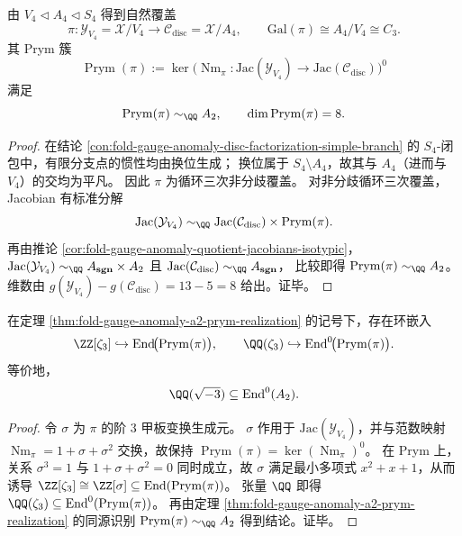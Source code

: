 \begin{theorem}\label{thm:fold-gauge-anomaly-a2-prym-realization}
由 \(V_4\triangleleft A_4\triangleleft S_4\) 得到自然覆盖
\[
\pi:\mathcal Y_{V_4}=\mathcal X/V_4\longrightarrow \mathcal C_{\mathrm{disc}}=\mathcal X/A_4,
\qquad
\mathrm{Gal}(\pi)\cong A_4/V_4\cong C_3.
\]
其 Prym 簇
\[
\operatorname{Prym}(\pi):=\ker\!\bigl(\operatorname{Nm}_{\pi}:\mathrm{Jac}(\mathcal Y_{V_4})\to \mathrm{Jac}(\mathcal C_{\mathrm{disc}})\bigr)^0
\]
满足
\[
\operatorname{Prym}(\pi)\sim_{\QQ}A_2,
\qquad
\dim \operatorname{Prym}(\pi)=8.
\]
\end{theorem}
\begin{proof}
在结论 \ref{con:fold-gauge-anomaly-disc-factorization-simple-branch} 的 \(S_4\)-闭包中，有限分支点的惯性均由换位生成；
换位属于 \(S_4\setminus A_4\)，故其与 \(A_4\)（进而与 \(V_4\)）的交均为平凡。
因此 \(\pi\) 为循环三次非分歧覆盖。
对非分歧循环三次覆盖，Jacobian 有标准分解
\[
\mathrm{Jac}(\mathcal Y_{V_4})\sim_{\QQ}\mathrm{Jac}(\mathcal C_{\mathrm{disc}})\times \operatorname{Prym}(\pi).
\]
再由推论 \ref{cor:fold-gauge-anomaly-quotient-jacobians-isotypic}，
\(
\mathrm{Jac}(\mathcal Y_{V_4})\sim_{\QQ}A_{\mathbf{sgn}}\times A_2
\)
且
\(
\mathrm{Jac}(\mathcal C_{\mathrm{disc}})\sim_{\QQ}A_{\mathbf{sgn}}
\)，
比较即得 \(\operatorname{Prym}(\pi)\sim_{\QQ}A_2\)。
维数由
\(
g(\mathcal Y_{V_4})-g(\mathcal C_{\mathrm{disc}})=13-5=8
\)
给出。证毕。
\end{proof}


\begin{theorem}\label{thm:fold-gauge-anomaly-a2-eisenstein-multiplication}
在定理 \ref{thm:fold-gauge-anomaly-a2-prym-realization} 的记号下，存在环嵌入
\[
\ZZ[\zeta_3]\hookrightarrow \operatorname{End}\!\bigl(\operatorname{Prym}(\pi)\bigr),
\qquad
\QQ(\zeta_3)\hookrightarrow \operatorname{End}^0\!\bigl(\operatorname{Prym}(\pi)\bigr).
\]
等价地，
\[
\QQ(\sqrt{-3})\subseteq \operatorname{End}^0(A_2).
\]
\end{theorem}
\begin{proof}
令 \(\sigma\) 为 \(\pi\) 的阶 \(3\) 甲板变换生成元。
\(\sigma\) 作用于 \(\mathrm{Jac}(\mathcal Y_{V_4})\)，并与范数映射 \(\operatorname{Nm}_{\pi}=1+\sigma+\sigma^2\) 交换，故保持
\(\operatorname{Prym}(\pi)=\ker(\operatorname{Nm}_{\pi})^0\)。
在 Prym 上，关系 \(\sigma^3=1\) 与 \(1+\sigma+\sigma^2=0\) 同时成立，故
\(\sigma\) 满足最小多项式 \(x^2+x+1\)，从而诱导
\(
\ZZ[\zeta_3]\cong \ZZ[\sigma]\subseteq \operatorname{End}(\operatorname{Prym}(\pi))
\)。
张量 \(\QQ\) 即得 \(\QQ(\zeta_3)\subseteq \operatorname{End}^0(\operatorname{Prym}(\pi))\)。
再由定理 \ref{thm:fold-gauge-anomaly-a2-prym-realization} 的同源识别
\(\operatorname{Prym}(\pi)\sim_{\QQ}A_2\) 得到结论。证毕。
\end{proof}

